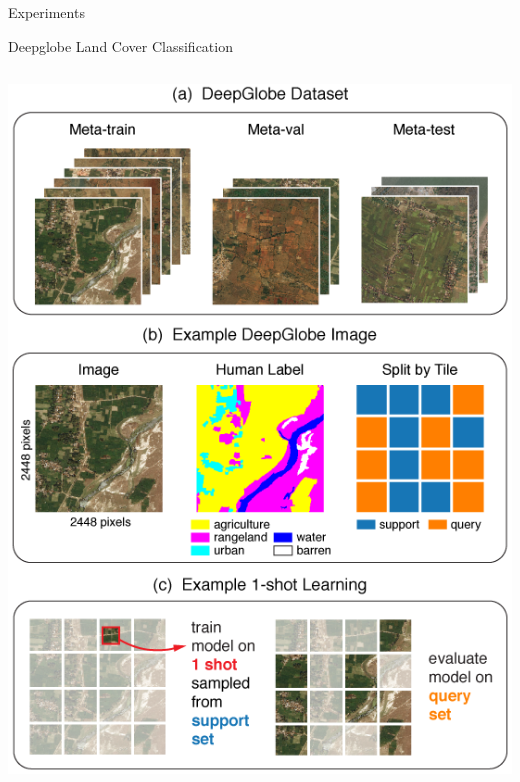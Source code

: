 \documentclass[11pt]{beamer}
\begin{document}
	\begin{frame}[plain]
		\vfill
		\Large \centering
			Experiments
		\vfill
	\end{frame}
	
	\begin{frame}{Deepglobe Land Cover Classification}
		\begin{columns}
			\includegraphics[width=\textwidth]{deepglobe/deepglobe_dataset}
			
				

\end{columns}
\end{frame}
\end{document}
